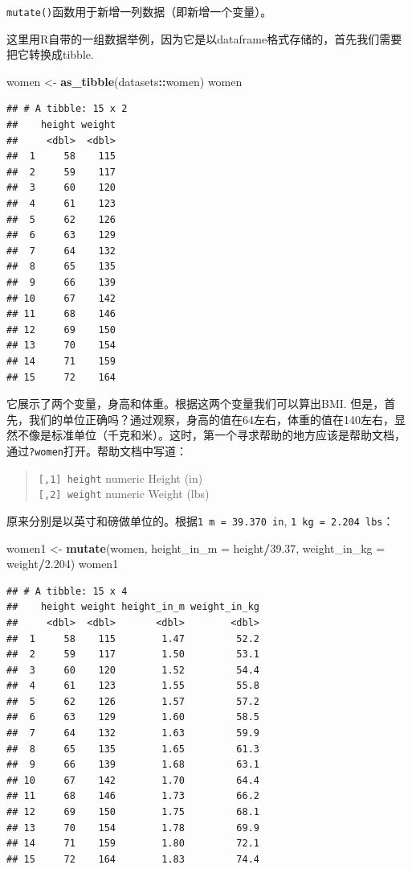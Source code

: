 \documentclass[]{book}
\newenvironment{Shaded}{\begin{snugshade}}{\end{snugshade}}
\newcommand{\DataTypeTok}[1]{\textcolor[rgb]{0.13,0.29,0.53}{#1}}
\newcommand{\FloatTok}[1]{\textcolor[rgb]{0.00,0.00,0.81}{#1}}
\newcommand{\KeywordTok}[1]{\textcolor[rgb]{0.13,0.29,0.53}{\textbf{#1}}}
\newcommand{\NormalTok}[1]{#1}
\newcommand{\OperatorTok}[1]{\textcolor[rgb]{0.81,0.36,0.00}{\textbf{#1}}}
\newcommand{\StringTok}[1]{\textcolor[rgb]{0.31,0.60,0.02}{#1}}
\begin{document}
\texttt{mutate()}函数用于新增一列数据（即新增一个变量）。

这里用R自带的一组数据举例，因为它是以dataframe格式存储的，首先我们需要把它转换成tibble.

\begin{Shaded}
\begin{Highlighting}[]
\NormalTok{women <-}\StringTok{ }\KeywordTok{as_tibble}\NormalTok{(datasets}\OperatorTok{::}\NormalTok{women)}
\NormalTok{women}
\end{Highlighting}
\end{Shaded}

\begin{verbatim}
## # A tibble: 15 x 2
##    height weight
##     <dbl>  <dbl>
##  1     58    115
##  2     59    117
##  3     60    120
##  4     61    123
##  5     62    126
##  6     63    129
##  7     64    132
##  8     65    135
##  9     66    139
## 10     67    142
## 11     68    146
## 12     69    150
## 13     70    154
## 14     71    159
## 15     72    164
\end{verbatim}

它展示了两个变量，身高和体重。根据这两个变量我们可以算出BMI. 但是，首先，我们的单位正确吗？通过观察，身高的值在64左右，体重的值在140左右，显然不像是标准单位（千克和米）。这时，第一个寻求帮助的地方应该是帮助文档，通过\texttt{?women}打开。帮助文档中写道：

\begin{quote}
\texttt{{[},1{]}\ height} numeric Height (in)\\
\texttt{{[},2{]}\ weight} numeric Weight (lbs)
\end{quote}

原来分别是以英寸和磅做单位的。根据\texttt{1\ m\ =\ 39.370\ in}, \texttt{1\ kg\ =\ 2.204\ lbs}：

\begin{Shaded}
\begin{Highlighting}[]
\NormalTok{women1 <-}\StringTok{ }\KeywordTok{mutate}\NormalTok{(women, }
                \DataTypeTok{height_in_m =}\NormalTok{ height}\OperatorTok{/}\FloatTok{39.37}\NormalTok{,}
                \DataTypeTok{weight_in_kg =}\NormalTok{ weight}\OperatorTok{/}\FloatTok{2.204}\NormalTok{)}
\NormalTok{women1}
\end{Highlighting}
\end{Shaded}

\begin{verbatim}
## # A tibble: 15 x 4
##    height weight height_in_m weight_in_kg
##     <dbl>  <dbl>       <dbl>        <dbl>
##  1     58    115        1.47         52.2
##  2     59    117        1.50         53.1
##  3     60    120        1.52         54.4
##  4     61    123        1.55         55.8
##  5     62    126        1.57         57.2
##  6     63    129        1.60         58.5
##  7     64    132        1.63         59.9
##  8     65    135        1.65         61.3
##  9     66    139        1.68         63.1
## 10     67    142        1.70         64.4
## 11     68    146        1.73         66.2
## 12     69    150        1.75         68.1
## 13     70    154        1.78         69.9
## 14     71    159        1.80         72.1
## 15     72    164        1.83         74.4
\end{verbatim}
\end{document}
